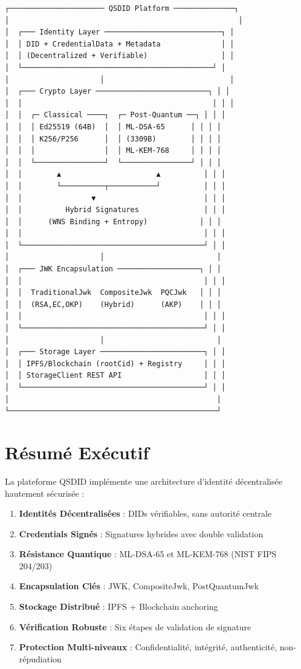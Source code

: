\documentclass[12pt,a4paper]{report}
\begin{document}
\begin{lstlisting}
┌────────────────────── QSDID Platform ──────────────┐
│                                                     │
│  ┌─── Identity Layer ───────────────────────────┐ │
│  │ DID + CredentialData + Metadata              │ │
│  │ (Decentralized + Verifiable)                 │ │
│  └────────────────────────────────────────────┘ │
│                     │                             │
│  ┌─── Crypto Layer ──────────────────────────┐ │ │
│  │                                            │ │ │
│  │  ┌─ Classical ────┐  ┌─ Post-Quantum ──┐ │ │ │
│  │  │ Ed25519 (64B)  │  │ ML-DSA-65      │ │ │ │
│  │  │ K256/P256      │  │ (3309B)        │ │ │ │
│  │  │                │  │ ML-KEM-768     │ │ │ │
│  │  └────────────────┘  └────────────────┘ │ │ │
│  │        ▲                      ▲          │ │ │
│  │        └──────────┬───────────┘          │ │ │
│  │                ▼                         │ │ │
│  │          Hybrid Signatures               │ │ │
│  │      (WNS Binding + Entropy)            │ │ │
│  │                                          │ │ │
│  └──────────────────────────────────────────┘ │ │
│                     │                          │
│  ┌─── JWK Encapsulation ───────────────────┐ │ │
│  │                                          │ │ │
│  │  TraditionalJwk  CompositeJwk  PQCJwk   │ │ │
│  │  (RSA,EC,OKP)    (Hybrid)      (AKP)    │ │ │
│  │                                          │ │ │
│  └──────────────────────────────────────────┘ │ │
│                     │                          │
│  ┌─── Storage Layer ────────────────────────┐ │ │
│  │ IPFS/Blockchain (rootCid) + Registry     │ │ │
│  │ StorageClient REST API                   │ │ │
│  └──────────────────────────────────────────┘ │ │
│                                                │
└────────────────────────────────────────────────┘
\end{lstlisting}

\section{Résumé Exécutif}

La plateforme QSDID implémente une architecture d'identité décentralisée hautement sécurisée :

\begin{enumerate}
  \item \textbf{Identités Décentralisées} : DIDs vérifiables, sans autorité centrale
  \item \textbf{Credentials Signés} : Signatures hybrides avec double validation
  \item \textbf{Résistance Quantique} : ML-DSA-65 et ML-KEM-768 (NIST FIPS 204/203)
  \item \textbf{Encapsulation Clés} : JWK, CompositeJwk, PostQuantumJwk
  \item \textbf{Stockage Distribué} : IPFS + Blockchain anchoring
  \item \textbf{Vérification Robuste} : Six étapes de validation de signature
  \item \textbf{Protection Multi-niveaux} : Confidentialité, intégrité, authenticité, non-répudiation
\end{enumerate}
\end{document}

